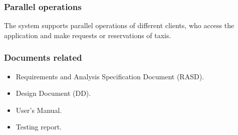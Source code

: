 \documentclass[18pt,oneside,a4paper, titlepage]{article}
\begin{document}
		\subsubsection{Parallel operations}
			The system supports parallel operations of different clients, who access the application and make requests or reservations of taxis.
		
		\subsubsection{Documents related}
			\begin{itemize}
				\item Requirements and Analysis Specification Document (RASD).
				\item Design Document (DD).
				\item User's Manual.
				\item Testing report.
			\end{itemize}
		
\end{document}
